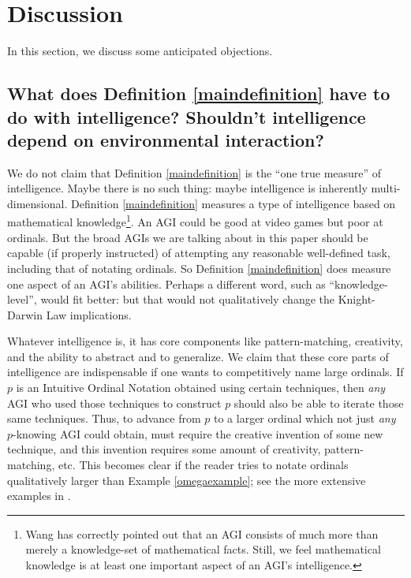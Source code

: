 \documentclass[runningheads]{llncs}
\begin{document}
\section{Discussion}
\label{objectionsection}

In this section, we discuss some anticipated objections.

\subsection{What does Definition \ref{maindefinition} have to do with intelligence?
Shouldn't intelligence depend on environmental interaction?}

We do not claim that Definition \ref{maindefinition} is the ``one true measure'' of
intelligence. Maybe there is no such thing: maybe intelligence is inherently
multi-dimensional. Definition \ref{maindefinition} measures a type of
intelligence based on mathematical knowledge\footnote{Wang has
correctly pointed out \cite{wang2007} that an AGI consists of much more than merely
a knowledge-set of mathematical facts. Still, we feel mathematical knowledge is at least
one important aspect of an AGI's intelligence.}. An AGI could be good at video games
but poor at ordinals. But the broad AGIs we are talking about in this paper
should be capable (if properly
instructed) of attempting any reasonable well-defined task, including that of
notating ordinals. So Definition \ref{maindefinition} does
measure one aspect of an AGI's abilities. Perhaps
a different word, such as
``knowledge-level'', would fit better: but
that would not qualitatively change
the Knight-Darwin Law implications.

Whatever intelligence is, it has core components like pattern-matching,
creativity, and the ability to abstract and to generalize.
We claim that these core parts of intelligence are indispensable if one wants to
competitively name large ordinals. If $p$ is an Intuitive Ordinal Notation
obtained using certain techniques, then \emph{any} AGI who used those
techniques to construct $p$ should also be able to iterate those same techniques.
Thus, to advance from
$p$ to a larger ordinal which not just \emph{any} $p$-knowing
AGI could obtain, must require
the creative invention of some new technique, and
this invention requires some amount of creativity,
pattern-matching, etc. This becomes clear if the reader tries to
notate ordinals qualitatively larger than Example \ref{omegaexample};
see the more extensive examples in \cite{github}.
\end{document}
